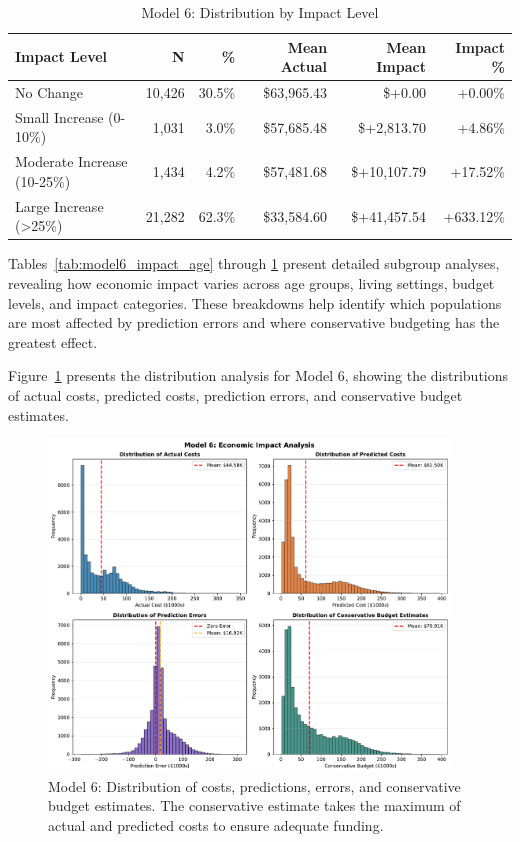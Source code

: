 \begin{table}[htbp]
\centering
\small
\caption{Model 6: Distribution by Impact Level}
\label{tab:model6_impact_distribution}
\begin{tabular}{lrrrrr}
\toprule
\textbf{Impact Level} & \textbf{N} & \textbf{\%} & \textbf{Mean Actual} & \textbf{Mean Impact} & \textbf{Impact \%} \\
\midrule
No Change & 10,426 & 30.5\% & \$63,965.43 & \$+0.00 & +0.00\% \\
Small Increase (0-10\%) & 1,031 & 3.0\% & \$57,685.48 & \$+2,813.70 & +4.86\% \\
Moderate Increase (10-25\%) & 1,434 & 4.2\% & \$57,481.68 & \$+10,107.79 & +17.52\% \\
Large Increase (>25\%) & 21,282 & 62.3\% & \$33,584.60 & \$+41,457.54 & +633.12\% \\
\bottomrule
\end{tabular}
\end{table}

Tables~\ref{tab:model6_impact_age} through \ref{tab:model6_impact_distribution} present detailed subgroup analyses, revealing how economic impact varies across age groups, living settings, budget levels, and impact categories. These breakdowns help identify which populations are most affected by prediction errors and where conservative budgeting has the greatest effect.

Figure~\ref{fig:model6_impact_histograms} presents the distribution analysis for Model 6, showing the distributions of actual costs, predicted costs, prediction errors, and conservative budget estimates.

\begin{figure}[htbp]
\centering
\includegraphics[width=0.95\textwidth]{figures/model_6_Impact_Histograms.pdf}
\caption{Model 6: Distribution of costs, predictions, errors, and conservative budget estimates. The conservative estimate takes the maximum of actual and predicted costs to ensure adequate funding.}
\label{fig:model6_impact_histograms}
\end{figure}

